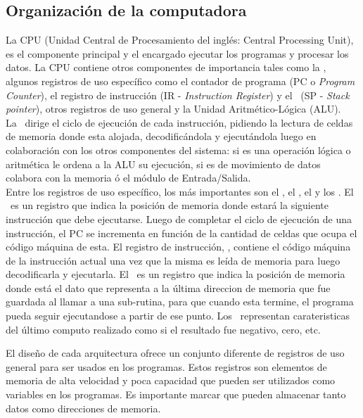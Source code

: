 \subsection{Organización de la computadora}

La CPU (Unidad Central de Procesamiento del inglés: Central Processing Unit), es el componente principal y el encargado ejecutar los programas y procesar los datos. La CPU contiene otros componentes de importancia tales como la \UC, algunos registros de uso específico como el contador de programa (PC o \textit{Program Counter}), el registro de instrucción (IR - \textit{Instruction Register}) y el \SP\ (SP - \textit{Stack pointer}), otros registros de uso general y la Unidad Aritmético-Lógica (ALU).\\

La \UC\ dirige el ciclo de ejecución de cada instrucción, pidiendo la lectura de celdas de memoria donde esta alojada, decodificándola  y ejecutándola luego en colaboración con los otros componentes del sistema: si es una operación lógica o aritmética le ordena a la ALU su ejecución, si es de movimiento de datos colabora con la memoria ó el módulo de Entrada/Salida.\\

Entre los registros de uso específico, los más importantes son el \textbf{\PC}, el \textbf{\IR}, el \textbf{\SP} y los \textbf{\FLAGS}. El \PC\ es un registro que indica la posición de memoria donde estará la siguiente instrucción que debe ejecutarse. Luego de completar el ciclo de ejecución de una instrucción, el PC se incrementa en función de la cantidad de celdas que ocupa el código máquina de esta. 
El registro de instrucción, \textbf{\IR}, contiene el código máquina de la instrucción actual una vez que la misma es leída de memoria para luego decodificarla y ejecutarla.
El \SP\ es un registro que indica la posición de memoria donde está el dato que representa a la última direccion de memoria que fue guardada al llamar a una sub-rutina, para que cuando esta termine, el programa pueda seguir ejecutandose a partir de ese punto.
Los \FLAGS\ representan carateristicas del último computo realizado como si el resultado fue negativo, cero, etc.

El diseño de cada arquitectura ofrece un conjunto diferente de registros de uso general para ser usados en los programas. Estos registros son elementos de memoria de alta velocidad y poca capacidad que pueden ser utilizados como variables en los programas. Es importante marcar que pueden almacenar tanto datos como direcciones de memoria.\\

